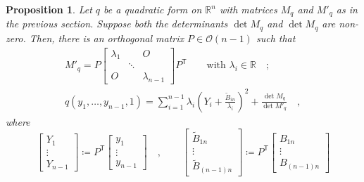 \documentclass[pdftex,a4paper,12pt]{scrartcl}
\theoremstyle{plain}
\newtheorem{proposition}[theorem]{Proposition}
\theoremstyle{definition}
\theoremstyle{remark}
\begin{document}
\begin{proposition}
\label{prop:quad-standard}
Let $q$ be a quadratic form on $\mathbb R^n$ with matrices $M_q$ and $M'_q$ as in the previous section.
Suppose both the determinants $\det M_q$ and $\det M_q$ are non-zero.
Then, there is an orthogonal matrix $P\in\mathcal O(n-1)$ such that
\begin{gather}
\label{eq:M'-diag}
M'_q = P
\begin{bmatrix}
\lambda_1 && O \\
& \ddots & \\
O && \lambda_{n-1}
\end{bmatrix}
P^{\mathsf T}
\qquad\text{with $\lambda_i\in\mathbb R$}
\quad;
\\
\label{eq:q-standard}
q(y_1,\dots,y_{n-1},1)
= \sum_{i=1}^{n-1} \lambda_i\left(Y_i+\frac{\widetilde B_{i n}}{\lambda_i}\right)^2 + \frac{\det M_q}{\det M'_q}
\quad,
\end{gather}
where
\[
\begin{bmatrix}
Y_1\\\vdots\\ Y_{n-1}
\end{bmatrix}
\coloneqq P^{\mathsf T}
\begin{bmatrix}
y_1\\\vdots\\ y_{n-1}
\end{bmatrix}
\quad, \qquad
\begin{bmatrix}
\widetilde B_{1n} \\ \vdots \\ \widetilde B_{(n-1)n}
\end{bmatrix}
\coloneqq P^{\mathsf T}
\begin{bmatrix}
B_{1n} \\ \vdots \\ B_{(n-1)n}
\end{bmatrix}
\]
\end{proposition}
\end{document}
